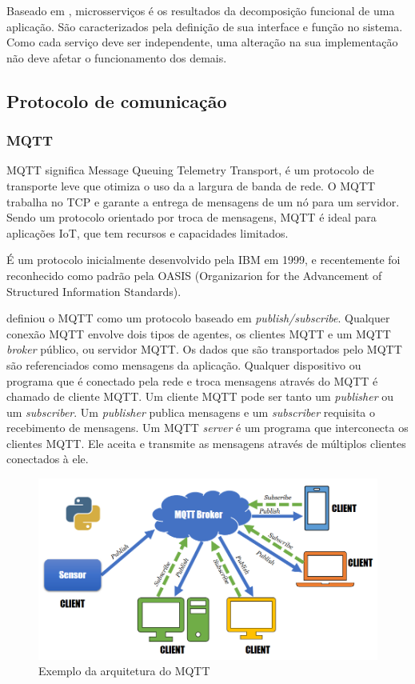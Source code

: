 Baseado em \cite{Pahl}, microsserviços é os resultados da decomposição funcional de uma aplicação. São caracterizados pela definição de sua interface e função no sistema. Como cada serviço deve ser independente, uma alteração na sua implementação não deve afetar o funcionamento dos demais.

\subsection{Protocolo de comunicação}

\subsubsection{MQTT}

MQTT significa Message Queuing Telemetry Transport, é um protocolo de transporte leve que otimiza o uso da a largura de banda de rede.\cite{mqtt1} O MQTT trabalha no TCP e garante a entrega de mensagens de um nó para um servidor. Sendo um protocolo orientado por troca de mensagens, MQTT é ideal para aplicações IoT, que tem recursos e capacidades limitados.

É um protocolo inicialmente desenvolvido pela IBM \cite{mqtt-ibm} em 1999, e recentemente foi reconhecido como padrão pela OASIS (Organizarion for the Advancement of Structured Information Standards).\cite{mqtt-oasis}

\cite{Kodali2017} definiou o MQTT como um protocolo baseado em \textit {publish/subscribe}. Qualquer conexão MQTT envolve dois tipos de agentes, os clientes MQTT e um MQTT \textit {broker} público, ou servidor MQTT. Os dados que são transportados pelo MQTT são referenciados como mensagens da aplicação. Qualquer dispositivo ou programa que é conectado pela rede e troca mensagens através do MQTT é chamado de cliente MQTT. Um cliente MQTT pode ser tanto um \textit {publisher} ou um \textit {subscriber}. Um \textit {publisher} publica mensagens e um \textit {subscriber} requisita o recebimento de mensagens. Um MQTT \textit {server} é um programa que interconecta os clientes MQTT. Ele aceita e transmite as mensagens através de múltiplos clientes conectados à ele.

\begin{figure}[htbp]
	\centering
	\includegraphics[width=1\linewidth]{figuras/mqtt-architecture.png}
	\caption{Exemplo da arquitetura do MQTT}
	\label{fig:arquitetura-mqtt}
\end{figure}

